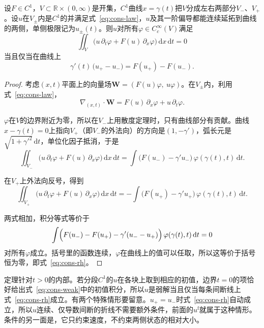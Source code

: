 \begin{theorem}
\label{thm:cons-rh}
设$F\in C^1$，$V\subset\mathbb{R}\times(0,\infty)$是开集，$C^1$曲线$x=\gamma(t)$把$V$分成左右两部分$V_-$、$V_+$。设$u$在$V_\pm$内是$C^1$的并满足式~\eqref{eq:cons-law}，$u$及其一阶偏导都能连续延拓到曲线的两侧，单侧极限记为$u_\pm(t)$。则$u$对所有$\varphi\in C_c^{\infty}(V)$满足
\begin{equation}
  \iint_V\bigl(u\,\partial_t\varphi+F(u)\,\partial_x\varphi\bigr)\,\mathrm{d}x\,\mathrm{d}t=0
  \label{eq:cons-rh-weak}
\end{equation}
当且仅当在曲线上
\begin{equation}
  \gamma'(t)\,\bigl(u_+-u_-\bigr)=F(u_+)-F(u_-).
  \label{eq:cons-rh}
\end{equation}
\end{theorem}

\begin{proof}
考虑$(x,t)$平面上的向量场$\bm{W}=(F(u)\varphi,\ u\varphi)$。在$V_\pm$内，利用式~\eqref{eq:cons-law}，
\[
  \nabla_{(x,t)}\cdot\bm{W}=F(u)\,\partial_x\varphi+u\,\partial_t\varphi .
\]

$\varphi$在$V$的边界附近为零，所以在$V_-$上用散度定理时，只有曲线部分有贡献。曲线$x-\gamma(t)=0$上指向$V_+$（即$V_-$的外法向）的方向是$(1,-\gamma')$，弧长元是$\sqrt{1+\gamma'^2}\,\mathrm{d}t$，单位化因子抵消，于是
\[
  \iint_{V_-}\bigl(u\,\partial_t\varphi+F(u)\,\partial_x\varphi\bigr)\,\mathrm{d}x\,\mathrm{d}t
  =\int\bigl(F(u_-)-\gamma'u_-\bigr)\,\varphi(\gamma(t),t)\,\mathrm{d}t .
\]

在$V_+$上外法向反号，得到
\[
  \iint_{V_+}\bigl(u\,\partial_t\varphi+F(u)\,\partial_x\varphi\bigr)\,\mathrm{d}x\,\mathrm{d}t
  =-\int\bigl(F(u_+)-\gamma'u_+\bigr)\,\varphi(\gamma(t),t)\,\mathrm{d}t .
\]

两式相加，积分等式等价于
\[
  \int\Bigl(F(u_-)-F(u_+)-\gamma'(u_--u_+)\Bigr)\,\varphi(\gamma(t),t)\,\mathrm{d}t=0
\]
对所有$\varphi$成立。括号里的函数连续，$\varphi$在曲线上的值可以任取，所以这等价于括号恒为零，即式~\eqref{eq:cons-rh}。
\end{proof}

定理针对$t>0$的内部。若分段$C^1$的$u$在各块上取到相应的初值，边界$t=0$的项恰好给出式~\eqref{eq:cons-weak}中的初值积分，所以$u$是弱解当且仅当每条间断线上式~\eqref{eq:cons-rh}成立。有两个特殊情形要留意。$u_+=u_-$时式~\eqref{eq:cons-rh}自动成立，所以$u$连续、仅导数间断的折线不需要额外条件，前面的$u^{\mathrm{f}}$就属于这种情形。条件的另一面是，它只约束速度，不约束两侧状态的相对大小。

